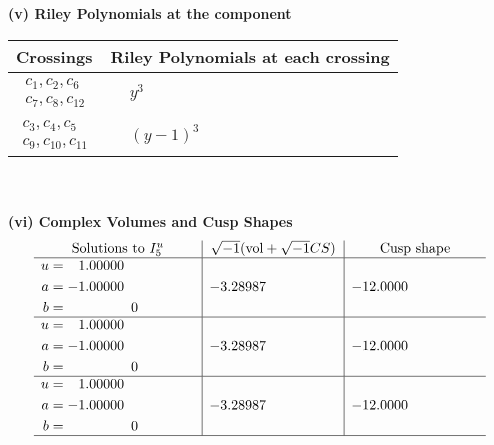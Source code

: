 \documentclass[1p]{elsarticle_modified}
\theoremstyle{definition}
\newcommand{\I}{\sqrt{-1}}
\begin{document}
\newpage\renewcommand{\arraystretch}{1}
\flushleft \textbf{(v) Riley Polynomials at the component}\newline \\
\begin{tabular}{m{50pt}|m{274pt}}
Crossings & \hspace{64pt}Riley Polynomials at each crossing \\
\hline $$\begin{aligned}c_{1},c_{2},c_{6}\\c_{7},c_{8},c_{12}\end{aligned}$$&$\begin{aligned}
&y^3
\end{aligned}$\\
\hline $$\begin{aligned}c_{3},c_{4},c_{5}\\c_{9},c_{10},c_{11}\end{aligned}$$&$\begin{aligned}
&(y-1)^3
\end{aligned}$\\
\hline
\end{tabular}\\~\\
\newpage\flushleft \textbf{(vi) Complex Volumes and Cusp Shapes}
$$\begin{array}{c|c|c}  
\text{Solutions to }I^u_{5}& \I (\text{vol} + \sqrt{-1}CS) & \text{Cusp shape}\\
 \hline 
\begin{aligned}
u &= \phantom{-}1.00000\phantom{ +0.000000I} \\
a &= -1.00000\phantom{ +0.000000I} \\
b &= \phantom{-0.000000 } 0\end{aligned}
 & -3.28987\phantom{ +0.000000I} & -12.0000\phantom{ +0.000000I} \\ \hline\begin{aligned}
u &= \phantom{-}1.00000\phantom{ +0.000000I} \\
a &= -1.00000\phantom{ +0.000000I} \\
b &= \phantom{-0.000000 } 0\end{aligned}
 & -3.28987\phantom{ +0.000000I} & -12.0000\phantom{ +0.000000I} \\ \hline\begin{aligned}
u &= \phantom{-}1.00000\phantom{ +0.000000I} \\
a &= -1.00000\phantom{ +0.000000I} \\
b &= \phantom{-0.000000 } 0\end{aligned}
 & -3.28987\phantom{ +0.000000I} & -12.0000\phantom{ +0.000000I}\\
 \hline 
 \end{array}$$\newpage
\end{document}
